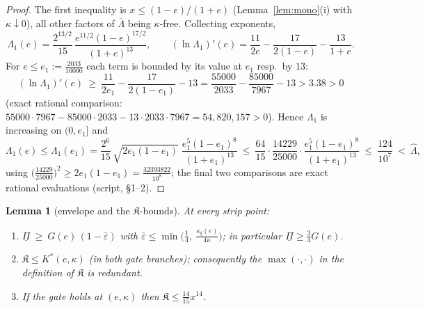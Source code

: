 \documentclass[11pt]{article}
\newtheorem{lemma}{Lemma}[section]
\theoremstyle{remark}
\newcommand{\eps}{\varepsilon}
\newcommand{\Kfrak}{\mathfrak K}
\newcommand{\Kstar}{K^{*}}
\newcommand{\kxi}{\kappa_\xi}
\newcommand{\epsbar}{\bar\eps}
\begin{document}
\begin{proof}
The first inequality is $x\le(1-e)/(1+e)$ (Lemma~\ref{lem:mono}(i) with
$\kappa\downarrow0$), all other factors of $\overline\Lambda$ being
$\kappa$-free.  Collecting exponents,
\[
        \Lambda_1(e)=\frac{2^{13/2}}{15}\,
        \frac{e^{11/2}(1-e)^{17/2}}{(1+e)^{13}},
        \qquad
        (\ln\Lambda_1)'(e)=\frac{11}{2e}-\frac{17}{2(1-e)}-\frac{13}{1+e}.
\]
For $e\le e_1:=\tfrac{2033}{10000}$ each term is bounded by its value at
$e_1$ resp.\ by $13$:
\[
        (\ln\Lambda_1)'(e)\ \ge\ \frac{11}{2e_1}-\frac{17}{2(1-e_1)}-13
        =\frac{55000}{2033}-\frac{85000}{7967}-13>3.38>0
\]
(exact rational comparison: $55000\cdot7967-85000\cdot2033-13\cdot2033\cdot
7967=54{,}820{,}157>0$).  Hence $\Lambda_1$ is increasing on $(0,e_1]$ and
\[
        \Lambda_1(e)\le\Lambda_1(e_1)
        =\frac{2^6}{15}\,\sqrt{2e_1(1-e_1)}\;
        \frac{e_1^5(1-e_1)^8}{(1+e_1)^{13}}
        \ \le\ \frac{64}{15}\cdot\frac{14229}{25000}\cdot
        \frac{e_1^5(1-e_1)^8}{(1+e_1)^{13}}
        \ \le\ \frac{124}{10^7}\ <\ \widehat\Lambda,
\]
using $\bigl(\tfrac{14229}{25000}\bigr)^2\ge2e_1(1-e_1)
=\tfrac{32393822}{10^8}$; the final two comparisons are exact rational
evaluations (script, \S1--2).
\end{proof}

\begin{lemma}[envelope and the $\Kfrak$-bounds]\label{lem:envelope}
At every strip point:
\begin{enumerate}[label=\textup{(\alph*)},itemsep=1pt]
\item $\underline\Pi\ \ge\ G(e)\,(1-\epsbar)$ with
$\epsbar\le\min\bigl(\tfrac14,\ \tfrac{\kxi(e)}{4\kappa}\bigr)$;
in particular $\underline\Pi\ge\tfrac34G(e)$.
\item $\Kfrak\le\Kstar(e,\kappa)$ (in both gate branches); consequently the
$\max(\cdot,\cdot)$ in the definition of $\Kfrak$ is redundant.
\item If the gate holds at $(e,\kappa)$ then
$\Kfrak\le\tfrac{14}{15}x^{14}$.
\end{enumerate}
\end{lemma}
\end{document}

